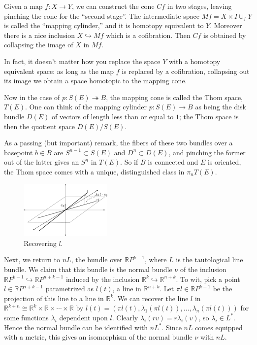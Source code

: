 \documentclass{article}
\newcommand{\R}{\mathbb{R}}
\newcommand{\RP}{\R P}
\newcommand{\into}{\hookrightarrow}
\newcommand{\onto}{\twoheadrightarrow}
\begin{document}
Given a map $f:X\to Y$, we can construct the cone $Cf$ in two stages, leaving pinching the cone for the ``second stage''. The intermediate space $Mf=X\times I\cup_f Y$ is called the ``mapping cylinder,'' and it is homotopy equivalent to $Y$.  Moreover there is a nice inclusion $X \into Mf$ which is a cofibration. Then $Cf$ is obtained by collapsing the image of $X$ in $Mf$.

In fact, it doesn't matter how you replace the space $Y$ with a homotopy equivalent space: as long as the map $f$ is replaced by a cofibration, collapsing out its image we obtain a space homotopic to the mapping cone.

Now in the case of $p: S(E) \onto B$, the mapping cone is called the Thom space, $T(E)$. 
One can think of the mapping cylinder $p:S(E)\to B$ as being the disk bundle $D(E)$ of vectors of length less than or equal to $1$; the Thom space is then the quotient space $D(E) / S(E)$. 

As a passing (but important) remark, the fibers of these two bundles over a basepoint $b \in B$ are $S^{n-1} \subset S(E)$ and $D^n \subset D(E)$, and pinching the former out of the latter gives an $S^n$ in $T(E)$.  So if $B$ is connected and $E$ is oriented, the Thom space comes with a unique, distinguished class in $\pi_n T(E)$.

\begin{figure}
\centering\includegraphics[width=0.4\textwidth]{figures/fig8.pdf}
\caption{\small Recovering $l$.}
\end{figure} %
Next, we return to $nL$, the bundle over $\RP^{k-1}$, where $L$ is the tautological line bundle.  We claim that this bundle is the normal bundle $\nu$ of the inclusion $\RP^{k-1} \into \RP^{n+k-1}$ induced by the inclusion $\R^k \into \R^{n+k}$.  To wit, pick a point $l \in \RP^{n+k-1}$ parametrized as $l(t)$, a line in $\R^{n+k}$.  Let $\pi l \in \RP^{k-1}$ be the projection of this line to a line in $\R^k$.  We can recover the line $l$ in $\R^{k+n} \cong \R^k \times \R \times \cdots \times \R$ by $l(t) = (\pi l(t), \lambda_1(\pi l(t)), \ldots, \lambda_n(\pi l(t)))$ for some functions $\lambda_i$ dependent upon $l$.  Clearly $\lambda_i(rv) = r \lambda_i(v)$, so $\lambda_i \in L^*$.  Hence the normal bundle can be identified with $nL^*$.  Since $nL$ comes equipped with a metric, this gives an isomorphism of the normal bundle $\nu$ with $nL$.
\end{document}
